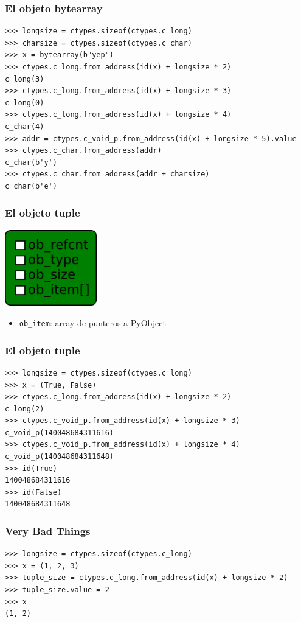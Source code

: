 \documentclass[10pt]{beamer}
\begin{document}
  \begin{frame}[containsverbatim]
    \frametitle{El objeto bytearray}
    \begin{verbatim}
>>> longsize = ctypes.sizeof(ctypes.c_long)
>>> charsize = ctypes.sizeof(ctypes.c_char)
>>> x = bytearray(b"yep")
>>> ctypes.c_long.from_address(id(x) + longsize * 2)
c_long(3)
>>> ctypes.c_long.from_address(id(x) + longsize * 3)
c_long(0)
>>> ctypes.c_long.from_address(id(x) + longsize * 4)
c_char(4)
>>> addr = ctypes.c_void_p.from_address(id(x) + longsize * 5).value
>>> ctypes.c_char.from_address(addr)
c_char(b'y')
>>> ctypes.c_char.from_address(addr + charsize)
c_char(b'e')
    \end{verbatim}
  \end{frame}

  \begin{frame}[containsverbatim]
    \frametitle{El objeto tuple}
    \begin{center}\includegraphics[width=4cm]{img/Tuple.png}\end{center}
    \begin{itemize}
      \item \verb+ob_item+: array de punteros a PyObject
    \end{itemize}
  \end{frame}

  \begin{frame}[containsverbatim]
    \frametitle{El objeto tuple}
    \begin{verbatim}
>>> longsize = ctypes.sizeof(ctypes.c_long)
>>> x = (True, False)
>>> ctypes.c_long.from_address(id(x) + longsize * 2)
c_long(2)
>>> ctypes.c_void_p.from_address(id(x) + longsize * 3)
c_void_p(140048684311616)
>>> ctypes.c_void_p.from_address(id(x) + longsize * 4)
c_void_p(140048684311648)
>>> id(True)
140048684311616
>>> id(False)
140048684311648
    \end{verbatim}
  \end{frame}

  \begin{frame}[containsverbatim]
    \frametitle{Very Bad Things}
    \begin{verbatim}
>>> longsize = ctypes.sizeof(ctypes.c_long)
>>> x = (1, 2, 3)
>>> tuple_size = ctypes.c_long.from_address(id(x) + longsize * 2)
>>> tuple_size.value = 2
>>> x
(1, 2)
    \end{verbatim}
  \end{frame}
\end{document}
